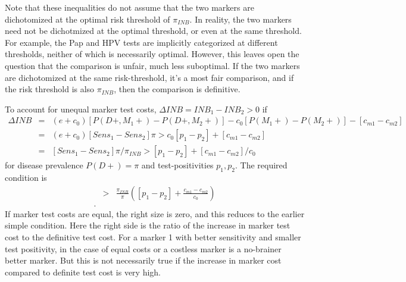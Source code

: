 \documentclass[11pt]{article}
\begin{document}

Note that these inequalities do not assume that the two markers are dichotomized at the optimal risk threshold of $\pi_{INB}$. In reality, the two markers need not be dichotmized at the optimal threshold, or even at the same threshold.  For example, the Pap and HPV tests are implicitly categorized at different thresholds, neither of which is necessarily optimal.  However, this leaves open the question that the comparison is unfair, much less suboptimal.  If the two markers are dichotomized at the same risk-threshold, it's a most fair comparison, and if the risk threshold is also $\pi_{INB}$, then the comparison is definitive.

To account for unequal marker test costs, $\Delta INB=INB_1-INB_2>0$ if
\begin{eqnarray*}
\Delta INB &=& (e+c_0)[P(D+,M_1+)-P(D+,M_2+)] - c_0[P(M_1+)-P(M_2+)] - [c_{m1}-c_{m2}]\\
           &=& (e+c_0)[Sens_1-Sens_2]\pi > c_0[p_1-p_2] + [c_{m1}-c_{m2}]\\
           &=& [Sens_1-Sens_2]\pi/\pi_{INB} > [p_1-p_2] + [c_{m1}-c_{m2}]/c_0
\end{eqnarray*}
for disease prevalence $P(D+)=\pi$ and test-positivities $p_1,p_2$.  The required condition is
\begin{eqnarray}
  [Sens_1-Sens_2]  &>& \frac{\pi_{INB}}{\pi} \left( [p_1-p_2] + \frac{c_{m1}-c_{m2}}{c_0} \right) \\.
\end{eqnarray}
If marker test costs are equal, the right size is zero, and this reduces to the earlier simple condition. Here the right side is the ratio of the increase in marker test cost to the definitive test cost.  For a marker 1 with better sensitivity and smaller test positivity, in the case of equal costs or a costless marker is a no-brainer better marker.  But this is not necessarily true if the increase in marker cost compared to definite test cost is very high.  
\end{document}
